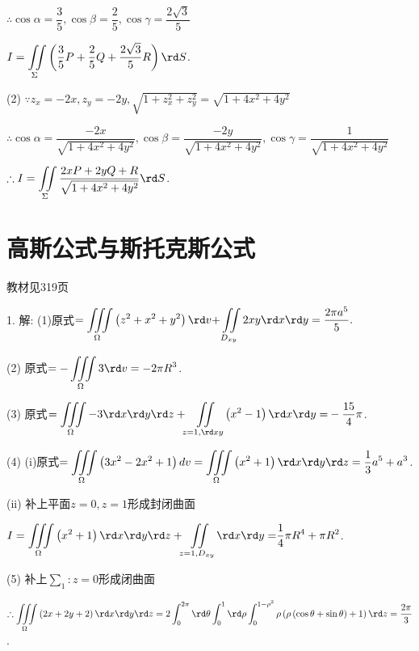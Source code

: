   $\therefore \cos \alpha =\dfrac{3}{5},\cos \beta =\dfrac{2}{5},\cos \gamma =\dfrac{2\sqrt{3}}{5}$

  $I=\displaystyle\iint\limits  \limits_{\Sigma} {\left( \dfrac{3}{5}P+\dfrac{2}{5}Q+\dfrac{2\sqrt{3}}{5}R \right)\rd S}$.

  (2) $\because {{z}_{x}}=-2x,{{z}_{y}}=-2y,\sqrt{1+z_{x}^{2}+z_{y}^{2}}=\sqrt{1+4{{x}^{2}}+4{{y}^{2}}}$

  $\therefore \cos \alpha =\dfrac{-2x}{\sqrt{1+4{{x}^{2}}+4{{y}^{2}}}},\cos \beta =\dfrac{-2y}{\sqrt{1+4{{x}^{2}}+4{{y}^{2}}}},\cos \gamma =\dfrac{1}{\sqrt{1+4{{x}^{2}}+4{{y}^{2}}}}$

  $\therefore I=\displaystyle\iint\limits  \limits_{\Sigma} {\dfrac{2xP+2yQ+R}{\sqrt{1+4{{x}^{2}}+4{{y}^{2}}}}}\rd S $.

\section{高斯公式与斯托克斯公式}
\begin{flushright}
  \color{zhanqing!80}
   教材见319页
\end{flushright}

  1. 解: (1)原式$=\displaystyle\iiint\limits\limits _{\Omega }{\left( {{z}^{2}}+{{x}^{2}}+{{y}^{2}} \right)\rd v\text{+}\iint\limits _{ D_{xy} }{2xy\rd x\rd y}=\dfrac{2\pi {{a}^{5}}}{5}}.$

  (2) 原式$=-\displaystyle\iiint\limits _{\Omega }{3 \rd v =-2\pi {{R}^{3}}}$.

  (3) 原式$=\displaystyle\iiint\limits _{\Omega }{-3\rd x\rd y\rd z+\iint\limits_{z=1,\rd xy}{\left( {{x}^{2}}-1 \right)\rd x\rd y}=}-\dfrac{15}{4}\pi $.

  (4) (i)原式$=\displaystyle\iiint\limits _{\Omega }{\left( 3{{x}^{2}}-2{{x}^{2}}+1 \right)dv=\iiint\limits _{\Omega }{\left( {{x}^{2}}+1 \right)\rd x\rd y\rd z=\dfrac{1}{3}{{a}^{5}}+{{a}^{3}}}}$.

  (ii) 补上平面$z=0,z=1$形成封闭曲面

  $I=\displaystyle\iiint\limits _{\Omega }{\left( {{x}^{2}}+1 \right)\rd x\rd y\rd z+\iint\limits _{z=1, D_{xy} }{\rd x\rd y}=}\dfrac{1}{4}\pi {{R}^{4}}+\pi {{R}^{2}}$.

  (5) 补上$\sum_1:z=0$形成闭曲面

  $\therefore \displaystyle\iiint\limits _{\Omega }{\left( 2x+2y+2 \right)\rd x\rd y\rd z=2\displaystyle\int_{0}^{2\pi }{\rd \theta \displaystyle\int_{0}^{1}{\rd \rho \displaystyle\int_{0}^{1-{{\rho }^{2}}}{\rho \left( \rho \left( \cos \theta +\sin \theta  \right)+1 \right)\rd z}}}}=\dfrac{2\pi }{3}$.

